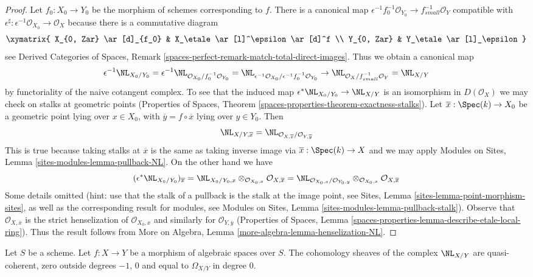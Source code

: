 \begin{proof}
Let $f_0 : X_0 \to Y_0$ be the morphism of schemes corresponding to $f$.
There is a canonical map
$\epsilon^{-1}f_0^{-1}\mathcal{O}_{Y_0} \to f_{small}^{-1}\mathcal{O}_Y$
compatible with
$\epsilon^\sharp : \epsilon^{-1}\mathcal{O}_{X_0} \to \mathcal{O}_X$
because there is a commutative diagram
$$
\xymatrix{
X_{0, Zar} \ar[d]_{f_0} & X_\etale \ar[l]^\epsilon \ar[d]^f \\
Y_{0, Zar} & Y_\etale \ar[l]_\epsilon
}
$$
see Derived Categories of Spaces, Remark
\ref{spaces-perfect-remark-match-total-direct-images}.
Thus we obtain a canonical map
$$
\epsilon^{-1}\NL_{X_0/Y_0} =
\epsilon^{-1}\NL_{\mathcal{O}_{X_0}/f_0^{-1}\mathcal{O}_{Y_0}} =
\NL_{\epsilon^{-1}\mathcal{O}_{X_0}/\epsilon^{-1}f_0^{-1}\mathcal{O}_{Y_0}}
\to
\NL_{\mathcal{O}_X/f^{-1}_{small}\mathcal{O}_Y} = \NL_{X/Y}
$$
by functoriality of the naive cotangent complex.
To see that the induced map $\epsilon^*\NL_{X_0/Y_0} \to \NL_{X/Y}$ is an
isomorphism in $D(\mathcal{O}_X)$ we may check on stalks at geometric points
(Properties of Spaces, Theorem
\ref{spaces-properties-theorem-exactness-stalks}).
Let $\overline{x} : \Spec(k) \to X_0$
be a geometric point lying over $x \in X_0$, with
$\overline{y} = f \circ \overline{x}$ lying over $y \in Y_0$. Then
$$
\NL_{X/Y, \overline{x}} =
\NL_{\mathcal{O}_{X, \overline{x}}/\mathcal{O}_{Y, \overline{y}}}
$$
This is true because taking stalks at $\overline{x}$ is the same
as taking inverse image via $\overline{x} : \Spec(k) \to X$
and we may apply Modules on Sites, Lemma \ref{sites-modules-lemma-pullback-NL}.
On the other hand we have
$$
(\epsilon^*\NL_{X_0/Y_0})_{\overline{x}} =
\NL_{X_0/Y_0, x} \otimes_{\mathcal{O}_{X_0, x}}
\mathcal{O}_{X, \overline{x}} =
\NL_{\mathcal{O}_{X_0, x}/\mathcal{O}_{Y_0, y}}
\otimes_{\mathcal{O}_{X_0, x}} \mathcal{O}_{X, \overline{x}}
$$
Some details omitted (hint: use that the stalk of a pullback
is the stalk at the image point, see
Sites, Lemma \ref{sites-lemma-point-morphism-sites},
as well as the corresponding result for modules, see
Modules on Sites, Lemma \ref{sites-modules-lemma-pullback-stalk}).
Observe that $\mathcal{O}_{X, \overline{x}}$ is the strict
henselization of $\mathcal{O}_{X_0, x}$ and similarly
for $\mathcal{O}_{Y, \overline{y}}$
(Properties of Spaces, Lemma
\ref{spaces-properties-lemma-describe-etale-local-ring}).
Thus the result follows from
More on Algebra,
Lemma \ref{more-algebra-lemma-henselization-NL}.
\end{proof}

\begin{lemma}
\label{lemma-netherlander-quasi-coherent}
Let $S$ be a scheme. Let $f : X \to Y$ be a morphism of
algebraic spaces over $S$. The cohomology sheaves
of the complex $\NL_{X/Y}$ are quasi-coherent, zero outside
degrees $-1$, $0$ and equal to $\Omega_{X/Y}$ in degree $0$.
\end{lemma}

